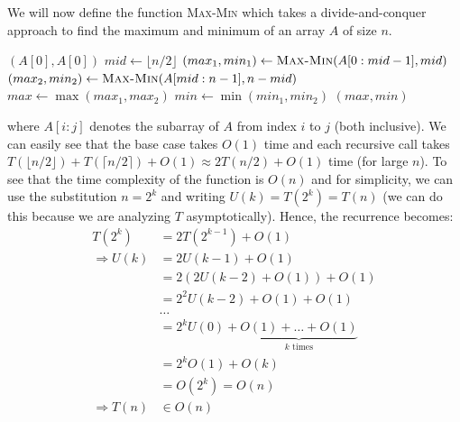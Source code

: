 \documentclass{article}
\begin{document}
  We will now define the function \textsc{Max-Min} which takes a divide-and-conquer approach to find the maximum and minimum of an array $A$ of size $n$.
  \begin{algorithmic}[H]
        \State \Return $(A[0], A[0])$
      \Else
        \State $mid \gets \lfloor n / 2 \rfloor$
        \State $(max_1, min_1) \gets \textsc{Max-Min}(A[0:mid-1], mid)$
        \State $(max_2, min_2) \gets \textsc{Max-Min}(A[mid:n-1], n - mid)$
        \State $max \gets \max(max_1, max_2)$
        \State $min \gets \min(min_1, min_2)$
        \State \Return $(max, min)$
      \EndIf
    \EndFunction
  \end{algorithmic}
  where $A[i:j]$ denotes the subarray of $A$ from index $i$ to $j$ (both inclusive).
  We can easily see that the base case takes $O(1)$ time and each recursive call takes $T(\lfloor n/2 \rfloor) + T(\lceil n/2 \rceil) + O(1) \approx 2 T(n/2) + O(1)$ time (for large $n$).
  To see that the time complexity of the function is $O(n)$ and for simplicity, we can use the substitution $n = 2^k$ and writing $U(k) = T(2^k) = T(n)$ (we can do this because we are analyzing $T$ asymptotically).
  Hence, the recurrence becomes:
  \begin{align*}
    T(2^k) &= 2 T(2^{k-1}) + O(1) \\
    \Rightarrow U(k) &= 2 U(k - 1) + O(1) \\
    &= 2(2 U(k - 2) + O(1)) + O(1) \\
    &= 2^2 U(k - 2) + O(1) + O(1) \\
    &\dots \\
    &= 2^k U(0) + \underbrace{O(1) + \dots + O(1)}_{k \text{ times}} \\
    &= 2^k O(1) + O(k) \\
    &= O(2^k) = O(n) \\
    \Rightarrow T(n) &\in O(n)
  \end{align*}
\end{document}
